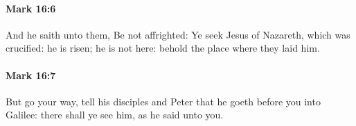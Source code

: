 		\paragraph{Mark 16:6} %
			\label{MARK-16-6}

			And he saith unto them, Be not affrighted: Ye seek Jesus of Nazareth, which was crucified: he is risen; he is not here: behold the place where they laid him.

			\begin{framed}
			\scriptsize
				\begin{compactdesc}
					\item[SBLG] 
				\end{compactdesc}
			\end{framed}

		\paragraph{Mark 16:7} %
			\label{MARK-16-7}

			But go your way, tell his disciples and Peter that he goeth before you into Galilee: there shall ye see him, as he said unto you.

